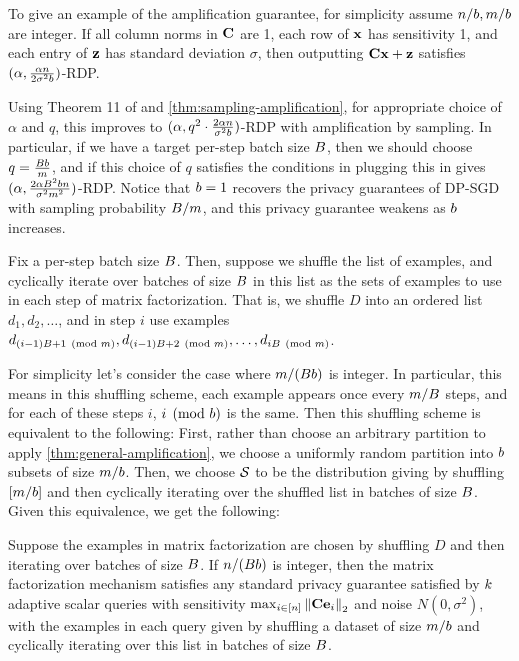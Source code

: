 \documentclass{article}
\begin{document}
\begin{example}
To give an example of the amplification guarantee, for simplicity assume $n / b, m / b$ are integer. If all column norms in $\mathbf{C}$ are 1, each row of $\mathbf{x}$ has sensitivity 1, and each entry of $\mathbf{z}$ has standard deviation $\sigma$, then outputting $\mathbf{C} \mathbf{x} + \mathbf{z}$ satisfies $(\alpha, \frac{\alpha n}{2 \sigma^2 b})$-RDP. 

Using Theorem 11 of \cite{MTZ19} and \cref{thm:sampling-amplification}, for appropriate choice of $\alpha$ and $q$, this improves to $(\alpha, q^2 \cdot \frac{2 \alpha n}{\sigma^2 b})$-RDP with amplification by sampling. In particular, if we have a target per-step batch size $B$, then we should choose $q = \frac{B b}{m}$, and if this choice of $q$ satisfies the conditions in \cite{MTZ19} plugging this in gives $(\alpha, \frac{2 \alpha B^2 b n}{\sigma^2 m^2})$-RDP. Notice that $b = 1$ recovers the privacy guarantees of DP-SGD with sampling probability $B / m$, and this privacy guarantee weakens as $b$ increases.
\end{example}

 Fix a per-step batch size $B$. Then, suppose we shuffle the list of examples, and cyclically iterate over batches of size $B$ in this list as the sets of examples to use in each step of matrix factorization. That is, we shuffle $D$ into an ordered list $d_1, d_2, \ldots$, and in step $i$ use examples $d_{(i-1)B + 1 \pmod {m}}, d_{(i-1)B + 2\pmod {m}}, \ldots, d_{iB \pmod {m}}$. 

For simplicity let's consider the case where $m / (B b)$ is integer. In particular, this means in this shuffling scheme, each example appears once every $m / B$ steps, and for each of these steps $i$, $i \pmod {b}$ is the same. Then this shuffling scheme is equivalent to the following: First, rather than choose an arbitrary partition to apply \cref{thm:general-amplification}, we choose a uniformly random partition into $b$ subsets of size $m / b$. Then, we choose $\mathcal{S}$ to be the distribution giving by shuffling $[m / b]$ and then cyclically iterating over the shuffled list in batches of size $B$. Given this equivalence, we get the following:

\begin{cor}\label{cor:amplification-by-shuffling}
Suppose the examples in matrix factorization are chosen by shuffling $D$ and then iterating over batches of size $B$. If $n / (B b)$ is integer, then the matrix factorization mechanism satisfies any standard privacy guarantee satisfied by  $k$ adaptive scalar queries with sensitivity $\max_{i \in [n]} \left\|\mathbf{C} \mathbf{e}_i\right\|_2$ and noise $N(0, \sigma^2)$, with the examples in each query given by shuffling a dataset of size $m / b$ and cyclically iterating over this list in batches of size $B$.
\end{cor}
\end{document}
